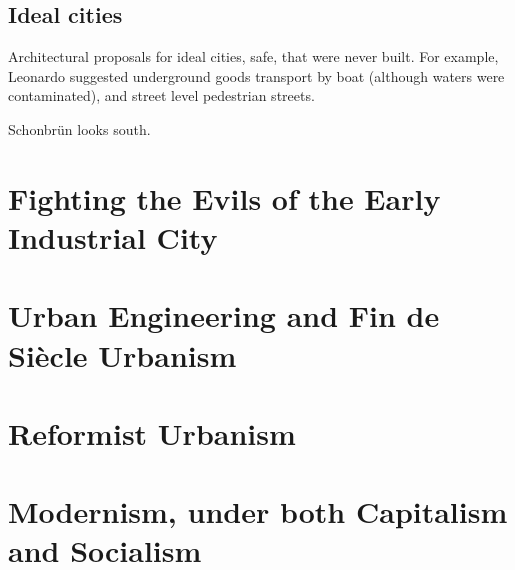 \documentclass{article}
\begin{document}
\subsection{Ideal cities}

Architectural proposals for ideal cities, safe, that were never built. 
For example, Leonardo suggested underground goods transport by boat (although waters were contaminated), and street level pedestrian streets.


Schonbrün looks south. 

\subsection{}

\section{Fighting the Evils of the Early Industrial City}

\subsection{}

\section{Urban Engineering and Fin de Siècle Urbanism}

\subsection{}

\section{Reformist Urbanism}

\subsection{}

\section{Modernism, under both Capitalism and Socialism}
\end{document}

